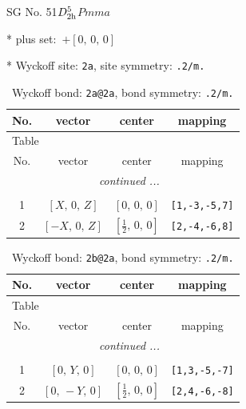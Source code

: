 \documentclass[fleqn,8pt]{jsarticle}
\begin{document}
\setcounter{MaxMatrixCols}{32}

\renewcommand{\tablename}{Table~}
\renewcommand{\figurename}{Figure~}
\begin{center}
\LARGE
SG No. 51\quad$D_{\rm 2h}^{5}$\quad$Pmma$\quad[ orthorhombic ]
\end{center}

* plus set:\,\,\,$+\left[ 0,\, 0,\, 0 \right]$


* Wyckoff site: {\tt 2a}, site symmetry: {\tt .2/m.}
\renewcommand{\arraystretch}{1.2}
\begin{longtable}{cccc}
\caption{Wyckoff bond: {\tt 2a@2a}, bond symmetry: {\tt .2/m.}}
 \\
 \hline \hline
No. & vector & center & mapping \\ \hline \endfirsthead

\multicolumn{3}{l}{\tablename\ \thetable{}} \\
 \hline \hline
No. & vector & center & mapping \\ \hline \endhead

 \hline \hline
\multicolumn{3}{r}{\footnotesize\it continued ...} \\ \endfoot

 \hline \hline
\multicolumn{3}{r}{} \\ \endlastfoot

1 & $\left[ X,\, 0,\, Z \right]$ & $\left[ 0,\, 0,\, 0 \right]$ & {\tt [1,-3,-5,7]} \\ \hline
2 & $\left[ - X,\, 0,\, Z \right]$ & $\left[ \frac{1}{2},\, 0,\, 0 \right]$ & {\tt [2,-4,-6,8]} \\
\end{longtable}
\renewcommand{\arraystretch}{1.2}
\begin{longtable}{cccc}
\caption{Wyckoff bond: {\tt 2b@2a}, bond symmetry: {\tt .2/m.}}
 \\
 \hline \hline
No. & vector & center & mapping \\ \hline \endfirsthead

\multicolumn{3}{l}{\tablename\ \thetable{}} \\
 \hline \hline
No. & vector & center & mapping \\ \hline \endhead

 \hline \hline
\multicolumn{3}{r}{\footnotesize\it continued ...} \\ \endfoot

 \hline \hline
\multicolumn{3}{r}{} \\ \endlastfoot

1 & $\left[ 0,\, Y,\, 0 \right]$ & $\left[ 0,\, 0,\, 0 \right]$ & {\tt [1,3,-5,-7]} \\ \hline
2 & $\left[ 0,\, - Y,\, 0 \right]$ & $\left[ \frac{1}{2},\, 0,\, 0 \right]$ & {\tt [2,4,-6,-8]} \\
\end{longtable}
\end{document}
